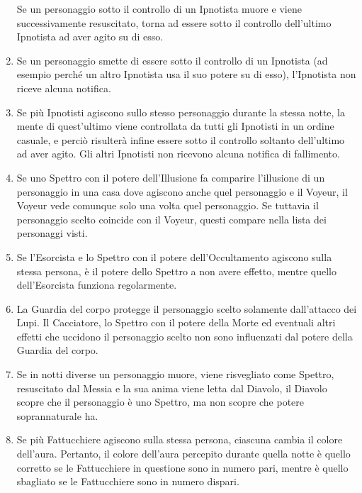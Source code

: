\documentclass[a4paper,10pt]{article}
\begin{document}
\begin{enumerate}
 Se un personaggio sotto il controllo di un Ipnotista muore e viene
successivamente resuscitato, torna ad essere sotto il controllo dell'ultimo
Ipnotista ad aver agito su di esso.
 
 \item Se un personaggio smette di essere sotto il controllo di un Ipnotista (ad
esempio perché un altro Ipnotista usa il suo potere su di esso), l'Ipnotista non
riceve alcuna notifica.
 
 \item Se più Ipnotisti agiscono sullo stesso personaggio durante la stessa
notte, la mente di quest'ultimo viene controllata da tutti gli Ipnotisti in un
ordine casuale, e perciò risulterà infine essere sotto il controllo soltanto
dell'ultimo ad aver agito. Gli altri Ipnotisti non ricevono alcuna notifica di
fallimento.
 
 \item Se uno Spettro con il potere dell'Illusione fa comparire l'illusione di un
personaggio in una casa dove agiscono anche quel personaggio e il Voyeur, il
Voyeur vede comunque solo una volta quel personaggio. Se tuttavia il personaggio
scelto coincide con il Voyeur, questi compare nella lista dei personaggi visti.

 \item Se l'Esorcista e lo Spettro con il potere dell'Occultamento agiscono
sulla stessa persona, è il potere dello Spettro a non avere effetto, mentre
quello dell'Esorcista funziona regolarmente.
 
 \item La Guardia del corpo protegge il personaggio scelto solamente
dall'attacco dei Lupi. Il Cacciatore, lo Spettro con il potere della Morte ed
eventuali altri effetti che uccidono il personaggio scelto non sono influenzati
dal potere della Guardia del corpo.
 
 \item Se in notti diverse un personaggio muore, viene risvegliato come Spettro,
resuscitato dal Messia e la sua anima viene letta dal Diavolo, il Diavolo scopre
che il personaggio è uno Spettro, ma non scopre che potere soprannaturale ha.
 
 \item Se più Fattucchiere agiscono sulla stessa persona, ciascuna cambia il
colore dell'aura. Pertanto, il colore dell'aura percepito durante quella notte è
quello corretto se le Fattucchiere in questione sono in numero pari, mentre è
quello sbagliato se le Fattucchiere sono in numero dispari.
 

\end{enumerate}
\end{document}
